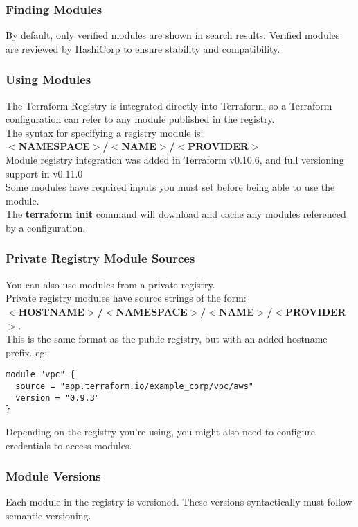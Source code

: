 \documentclass[12pt, letterpaper, twoside]{article}
\begin{document}
\subsubsection{Finding Modules}
By default, only verified modules are shown in search results. Verified modules are reviewed by 
HashiCorp to ensure stability and compatibility.

\subsubsection{Using Modules}
The Terraform Registry is integrated directly into Terraform, so a Terraform configuration can 
refer to any module published in the registry.\\
The syntax for specifying a registry module is:\\
\textbf{$<$NAMESPACE$>$/$<$NAME$>$/$<$PROVIDER$>$}\\

Module registry integration was added in Terraform v0.10.6, and full versioning support 
in v0.11.0\\

Some modules have required inputs you must set before being able to use the module.\\

The \textbf{terraform init} command will download and cache any modules referenced by 
a configuration.\\

\subsubsection{Private Registry Module Sources}
You can also use modules from a private registry.\\
Private registry modules have source strings of the form:\\
\textbf{$<$HOSTNAME$>$/$<$NAMESPACE$>$/$<$NAME$>$/$<$PROVIDER$>$}.\\ 
This is the same format as the public registry, but with an added hostname prefix.
eg:\\

\begin{verbatim}
module "vpc" {
  source = "app.terraform.io/example_corp/vpc/aws"
  version = "0.9.3"
}
\end{verbatim}
Depending on the registry you're using, you might also need to configure credentials 
to access modules.

\subsubsection{Module Versions}
Each module in the registry is versioned. These versions syntactically must follow 
semantic versioning.
\end{document}
